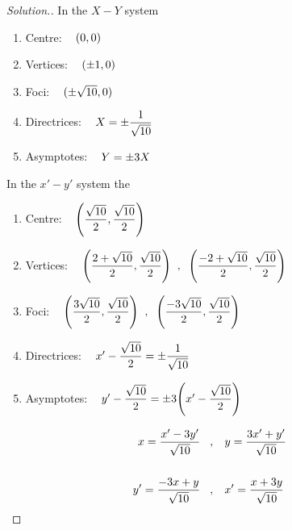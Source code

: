 \documentclass[11pt,a4paper]{article}
\theoremstyle{definition}
\newenvironment{solution}
  {\renewcommand{\qedsymbol}{}\begin{proof}[\textit{Solution}.]}
  {\end{proof}}
\begin{document}
\begin{solution}
In the $X-Y$ system
\begin{enumerate}
\item[] Centre: $\hspace{0.3cm} (0,0)$

\item[] Vertices: $\hspace{0.3cm}(\pm 1, 0)$

\item[] Foci: $\hspace{0.3cm} (\pm \sqrt{10}, 0)$

\item[] Directrices: $\hspace{0.3cm} X = \pm \dfrac{1}{\sqrt{10}}$

\item[] Asymptotes: $\hspace{0.3cm} Y = \pm 3X$
\end{enumerate}

In the $x'-y'$ system the
\begin{enumerate}
\item[] Centre: $\hspace{0.3cm} \Bigg(\dfrac{\sqrt{10}}{2},\dfrac{\sqrt{10}}{2}\Bigg)$

\item[] Vertices: $\hspace{0.3cm} \Bigg( \dfrac{2 + \sqrt{10}}{2},\dfrac{\sqrt{10}}{2}\Bigg) \hspace{0.2cm},\hspace{0.2cm} \Bigg( \dfrac{-2 + \sqrt{10}}{2},\dfrac{\sqrt{10}}{2}\Bigg)$

\item[] Foci: $\hspace{0.3cm}\Bigg(\dfrac{3\sqrt{10}}{2},\dfrac{\sqrt{10}}{2}\Bigg)\hspace{0.2cm},\hspace{0.2cm} \Bigg(\dfrac{-3\sqrt{10}}{2},\dfrac{\sqrt{10}}{2}\Bigg)$

\item[] Directrices: $\hspace{0.3cm} x' - \dfrac{\sqrt{10}}{2} = \pm \dfrac{1}{\sqrt{10}}$

\item[] Asymptotes: $\hspace{0.3cm} y' - \dfrac{\sqrt{10}}{2} = \pm 3\Bigg( x' - \dfrac{\sqrt{10}}{2}\Bigg)$
\end{enumerate}

\begin{align*}
x = \dfrac{x' - 3y'}{\sqrt{10}}\hspace{0.3cm} &,\hspace{0.3cm} y = \dfrac{3x' + y'}{\sqrt{10}}\\\\
y' = \dfrac{-3x + y}{\sqrt{10}} \hspace{0.3cm} &,\hspace{0.3cm} x' = \frac{x + 3y}{\sqrt{10}}\\
\end{align*}


\end{solution}
\end{document}
